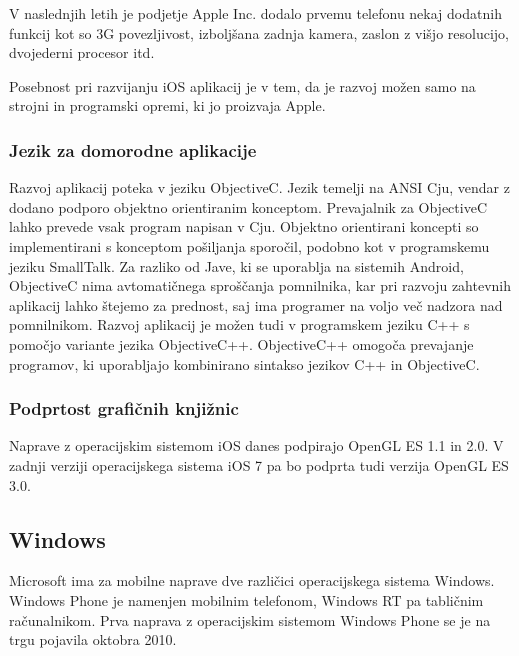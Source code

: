 V naslednjih letih je podjetje Apple Inc. dodalo prvemu telefonu nekaj dodatnih funkcij kot so 3G povezljivost, izboljšana zadnja kamera, zaslon z višjo resolucijo, dvojederni procesor itd.

Posebnost pri razvijanju iOS aplikacij je v tem, da je razvoj možen samo na strojni in programski opremi, ki jo proizvaja Apple.

\subsubsection{Jezik za domorodne aplikacije} 

Razvoj aplikacij poteka v jeziku ObjectiveC. Jezik temelji na ANSI Cju, vendar z dodano podporo objektno orientiranim konceptom. Prevajalnik za ObjectiveC lahko prevede vsak program napisan v Cju. Objektno orientirani koncepti so implementirani s konceptom pošiljanja sporočil, podobno kot v programskemu jeziku SmallTalk. Za razliko od Jave, ki se uporablja na sistemih Android, ObjectiveC nima avtomatičnega sproščanja pomnilnika, kar pri razvoju zahtevnih aplikacij lahko štejemo za prednost, saj ima programer na voljo več nadzora nad pomnilnikom. Razvoj aplikacij je možen tudi v programskem jeziku C++ s pomočjo variante jezika ObjectiveC++. ObjectiveC++ omogoča prevajanje programov, ki uporabljajo kombinirano sintakso jezikov C++ in ObjectiveC.

\subsubsection{Podprtost grafičnih knjižnic}

Naprave z operacijskim sistemom iOS danes podpirajo OpenGL ES 1.1 in 2.0. V zadnji verziji operacijskega sistema iOS 7 pa bo podprta tudi verzija OpenGL ES 3.0.

\subsection{Windows}

% 

Microsoft ima za mobilne naprave dve različici operacijskega sistema Windows. Windows Phone \cite{winphone} je namenjen mobilnim telefonom, Windows RT pa tabličnim računalnikom. Prva naprava z operacijskim sistemom Windows Phone se je na trgu pojavila oktobra 2010.


